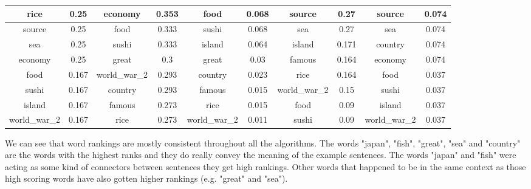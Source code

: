 \documentclass[12pt]{article}
\numberwithin{equation}{section}
\begin{document}
\begin{spacing}{1.5}
\begin{table}[H]
{\begin{tabular}{|cc|cc|cc|cc|cc|}
			\multicolumn{1}{|c|}{rice}          & 0.25    & \multicolumn{1}{c|}{economy}       & 0.353   & \multicolumn{1}{c|}{food}          & 0.068   & \multicolumn{1}{c|}{source}        & 0.27    & \multicolumn{1}{c|}{source}        & 0.074   \\ \hline
			\multicolumn{1}{|c|}{source}        & 0.25    & \multicolumn{1}{c|}{food}          & 0.333   & \multicolumn{1}{c|}{sushi}         & 0.068   & \multicolumn{1}{c|}{sea}           & 0.27    & \multicolumn{1}{c|}{sea}           & 0.074   \\ \hline
			\multicolumn{1}{|c|}{sea}           & 0.25    & \multicolumn{1}{c|}{sushi}         & 0.333   & \multicolumn{1}{c|}{island}        & 0.064   & \multicolumn{1}{c|}{island}        & 0.171   & \multicolumn{1}{c|}{country}       & 0.074   \\ \hline
			\multicolumn{1}{|c|}{economy}       & 0.25    & \multicolumn{1}{c|}{great}         & 0.3     & \multicolumn{1}{c|}{great}         & 0.03    & \multicolumn{1}{c|}{famous}        & 0.164   & \multicolumn{1}{c|}{economy}       & 0.074   \\ \hline
			\multicolumn{1}{|c|}{food}          & 0.167   & \multicolumn{1}{c|}{world\_war\_2} & 0.293   & \multicolumn{1}{c|}{country}       & 0.023   & \multicolumn{1}{c|}{rice}          & 0.164   & \multicolumn{1}{c|}{food}          & 0.037   \\ \hline
			\multicolumn{1}{|c|}{sushi}         & 0.167   & \multicolumn{1}{c|}{country}       & 0.293   & \multicolumn{1}{c|}{famous}        & 0.015   & \multicolumn{1}{c|}{world\_war\_2} & 0.15    & \multicolumn{1}{c|}{sushi}         & 0.037   \\ \hline
			\multicolumn{1}{|c|}{island}        & 0.167   & \multicolumn{1}{c|}{famous}        & 0.273   & \multicolumn{1}{c|}{rice}          & 0.015   & \multicolumn{1}{c|}{food}          & 0.09    & \multicolumn{1}{c|}{island}        & 0.037   \\ \hline
			\multicolumn{1}{|c|}{world\_war\_2} & 0.167   & \multicolumn{1}{c|}{rice}          & 0.273   & \multicolumn{1}{c|}{world\_war\_2} & 0.011   & \multicolumn{1}{c|}{sushi}         & 0.09    & \multicolumn{1}{c|}{world\_war\_2} & 0.037   \\ \hline
		\end{tabular}
	}
	\end{table}
	We can see that word rankings are mostly consistent throughout all the algorithms. The words "japan", "fish", "great", "sea" and "country" are the words with the highest ranks and they do really convey the meaning of the example sentences. The words "japan" and "fish" were acting as some kind of connectors between sentences they get high rankings. Other words that happened to be in the same context as those high scoring words have also gotten higher rankings (e.g. "great" and "sea"). 
	

\end{spacing}
\end{document}
